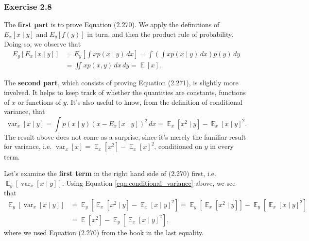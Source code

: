\documentclass[12pt, a4paper]{article}
\DeclareMathOperator{\E}{\mathbb{E}}
\DeclareMathOperator{\var}{\operatorname{var}}
\begin{document}
\subsubsection*{Exercise 2.8}
The \textbf{first part} is to prove Equation (2.270). 
We apply the definitions of $E_x \left[ x \mid y \right]$ and $E_y [f(y)]$ in turn, and then the product rule of probability.
Doing so, we observe that
\begin{align*}
	E_y \left[ E_x \left[ x \mid y \right]  \right] &= 
	E_y \left[ \int x p (x \mid y) \, dx  \right] 
	= \int \left( \int x p (x \mid y) \, dx \right)  p(y) \, dy \\
	&=  \iint x p(x, y) \, dx \, dy = \E[x].
\end{align*}

The \textbf{second part}, which consists of proving Equation (2.271), is slightly more involved.
It helps to keep track of whether the quantities are constants, functions of $x$ or functions of $y$.
It's also useful to know, from the definition of conditional variance, that
\begin{equation}
\label{eqn:conditional_variance}
	\var_x[ x \mid y ] 
	=
	\int p(x \mid y) \left( x - E_x \left[ x \mid y \right] \right)^2 \, dx
	=
	 \E_x [x^2 \mid y] - \E_x [x \mid y]^2.
\end{equation}
The result above does not come as a surprise, since it's merely the familiar result for variance, i.e. $\var_x[ x ] = \E_x [x^2] - \E_x [x ]^2$, conditioned on $y$ in every term.

Let's examine the \textbf{first term} in the right hand side of (2.270) first, i.e. $\E_y \left[ \var_x[ x \mid y ]  \right]$.
Using Equation \eqref{eqn:conditional_variance} above, we see that
\begin{align}
	\nonumber \E_y \left[ \var_x[ x \mid y ]  \right] &=  \E_y \left[ \E_x [x^2 \mid y] - \E_x [x \mid y]^2  \right]
	=
	\E_y \left[ \E_x [x^2 \mid y] \right] - \E_y \left[ \E_x [x \mid y]^2  \right] \\
	\label{eqn:ch2_prob8a} &= \E[x^2] - \E_y \left[ \E_x [x \mid y]^2  \right],
\end{align}
where we used Equation (2.270) from the book in the last equality.
\end{document}
